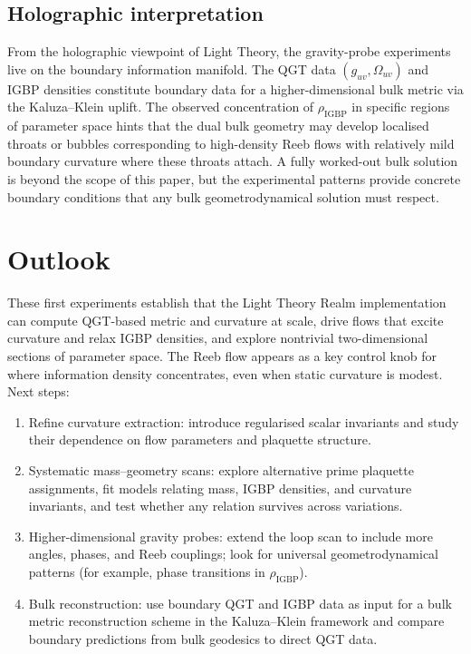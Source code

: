 \documentclass[12pt]{article}
\begin{document}
\subsection{Holographic interpretation}
From the holographic viewpoint of Light Theory, the gravity-probe experiments live on the boundary information manifold. The QGT data $(g_{uv}, \Omega_{uv})$ and IGBP densities constitute boundary data for a higher-dimensional bulk metric via the Kaluza--Klein uplift. The observed concentration of $\rho_{\mathrm{IGBP}}$ in specific regions of parameter space hints that the dual bulk geometry may develop localised throats or bubbles corresponding to high-density Reeb flows with relatively mild boundary curvature where these throats attach. A fully worked-out bulk solution is beyond the scope of this paper, but the experimental patterns provide concrete boundary conditions that any bulk geometrodynamical solution must respect.

\section{Outlook}
These first experiments establish that the Light Theory Realm implementation can compute QGT-based metric and curvature at scale, drive flows that excite curvature and relax IGBP densities, and explore nontrivial two-dimensional sections of parameter space. The Reeb flow appears as a key control knob for where information density concentrates, even when static curvature is modest. Next steps:
\begin{enumerate}
    \item Refine curvature extraction: introduce regularised scalar invariants and study their dependence on flow parameters and plaquette structure.
    \item Systematic mass--geometry scans: explore alternative prime plaquette assignments, fit models relating mass, IGBP densities, and curvature invariants, and test whether any relation survives across variations.
    \item Higher-dimensional gravity probes: extend the loop scan to include more angles, phases, and Reeb couplings; look for universal geometrodynamical patterns (for example, phase transitions in $\rho_{\mathrm{IGBP}}$).
    \item Bulk reconstruction: use boundary QGT and IGBP data as input for a bulk metric reconstruction scheme in the Kaluza--Klein framework and compare boundary predictions from bulk geodesics to direct QGT data.
\end{enumerate}



\end{document}
